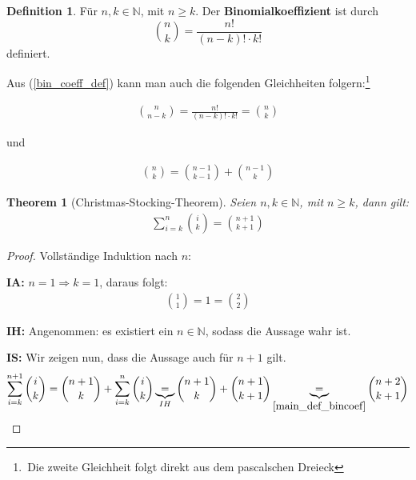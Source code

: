 \documentclass[12pt,oneside]{article}
\newtheorem{theorem}{Theorem}[section]
\theoremstyle{remark}
\theoremstyle{definition}
\newtheorem{definition}{Definition}[section]
\begin{document}
\begin{flushleft}
\begin{definition}\label{main_def_bincoef}
Für $n,k \in \mathbb{N}$, mit $n \geq k$. Der \textbf{Binomialkoeffizient} ist durch\newline\newline
\begin{equation}\label{bin_coeff_def}
    {n \choose k} = \frac{n!}{(n - k)! \cdot k!}
\end{equation}
definiert.\newline

Aus (\ref{bin_coeff_def}) kann man auch die folgenden Gleichheiten folgern:\footnote{$\,$Die zweite Gleichheit folgt direkt aus dem pascalschen Dreieck\cite{pascal}}\newline

\begin{align*}
{n \choose n - k} =  \frac{n!}{(n - k)! \cdot k!} = {n \choose k}
\end{align*}

\bigskip
und

\begin{align*}
    {n \choose k} = {n - 1 \choose k - 1} + {n - 1 \choose k}
\end{align*}


\end{definition}

\bigskip

\begin{theorem}[Christmas-Stocking-Theorem]\label{chr_sto_thm}
Seien $n,k \in \mathbb{N}$, mit $n \geq k$, dann gilt:
\begin{align*}
    \sum_{i = k}^{n}{i \choose k} = {n + 1 \choose k + 1}
\end{align*}
\end{theorem}

\begin{proof}
Vollständige Induktion nach $n$:

\textbf{IA:} $n = 1 \Rightarrow k = 1$, daraus folgt:
\begin{align*}
    {1 \choose 1} = 1 = {2 \choose 2}
\end{align*}

\textbf{IH:} Angenommen: es existiert ein $n \in \mathbb{N}$, sodass die Aussage wahr ist.

\textbf{IS:} Wir zeigen nun, dass die Aussage auch für $n + 1$ gilt.
\begin{align*}
    \sum_{i = k}^{n + 1}{i \choose k} = {n + 1 \choose k} + \sum_{i = k}^{n}{i \choose k} \underbrace{=}_{IH} {n + 1 \choose k} + {n + 1 \choose k + 1} \underbrace{=}_{\ref{main_def_bincoef}} {n + 2 \choose k + 1} 
\end{align*}
\end{proof}


\end{flushleft}
\end{document}
